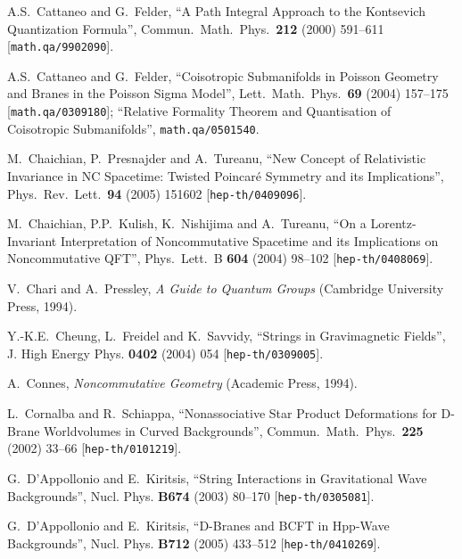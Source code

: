 \documentclass[11pt,a4paper]{article}
\newcommand{\1}{\mathbb{1}}
\begin{document}
\begin{thebibliography}{99}
  A.S.~Cattaneo and G.~Felder,
  ``A Path Integral Approach to the Kontsevich Quantization Formula'',
  Commun.\ Math.\ Phys.\  {\bf 212} (2000) 591--611
  [{\tt math.qa/9902090}].

  A.S.~Cattaneo and G.~Felder,
  ``Coisotropic Submanifolds in Poisson Geometry and Branes in the Poisson
  Sigma Model'',
  Lett.\ Math.\ Phys.\  {\bf 69} (2004) 157--175
  [{\tt math.qa/0309180}]; ``Relative Formality Theorem and
  Quantisation of Coisotropic Submanifolds'',
  {\tt math.qa/0501540}.

  M.~Chaichian, P.~Presnajder and A.~Tureanu,
  ``New Concept of Relativistic Invariance in NC Spacetime: Twisted Poincar\'e
  Symmetry and its Implications'',
  Phys.\ Rev.\ Lett.\  {\bf 94} (2005) 151602
  [{\tt hep-th/0409096}].

  M.~Chaichian, P.P.~Kulish, K.~Nishijima and A.~Tureanu,
  ``On a Lorentz-Invariant Interpretation of Noncommutative Spacetime
  and its Implications on Noncommutative QFT'',
  Phys.\ Lett.\ B {\bf 604} (2004) 98--102
  [{\tt hep-th/0408069}].

  V.~Chari and A.~Pressley,
  {\it A Guide to Quantum Groups} (Cambridge University Press, 1994).

 Y.-K.E.~Cheung, L.~Freidel and K.~Savvidy, ``Strings in
  Gravimagnetic Fields'', J. High Energy Phys. {\bf 0402} (2004) 054
  [{\tt hep-th/0309005}].

 A.~Connes, {\it Noncommutative Geometry}
  (Academic Press, 1994).

  L.~Cornalba and R.~Schiappa,
  ``Nonassociative Star Product Deformations for D-Brane Worldvolumes in
  Curved Backgrounds'',
  Commun.\ Math.\ Phys.\  {\bf 225} (2002) 33--66
  [{\tt hep-th/0101219}].

 G.~D'Appollonio and E.~Kiritsis, ``String Interactions
  in Gravitational Wave Backgrounds'', Nucl. Phys. {\bf B674} (2003)
  80--170 [{\tt hep-th/0305081}].

 G.~D'Appollonio and E.~Kiritsis, ``D-Branes and BCFT in
  Hpp-Wave Backgrounds'', Nucl. Phys. {\bf B712} (2005) 433--512
[{\tt hep-th/0410269}].


\end{thebibliography}
\end{document}
